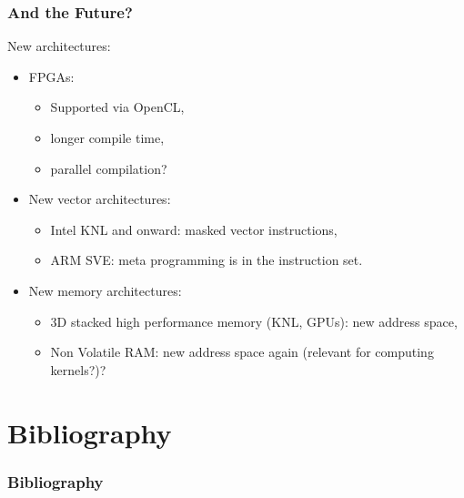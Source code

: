 \documentclass{beamer}
\begin{document}
\begin{frame}
  \frametitle{And the Future?}
  New architectures:
  \begin{itemize}
    \item FPGAs:
    \begin{itemize}
      \item Supported via OpenCL,
      \item longer compile time,
      \item parallel compilation?
    \end{itemize}
    \item New vector architectures:
    \begin{itemize}
      \item Intel KNL and onward: masked vector instructions,
      \item ARM SVE: meta programming is in the instruction set.
    \end{itemize}
    \item New memory architectures:
    \begin{itemize}
      \item 3D stacked high performance memory (KNL, GPUs): new address space,
      \item Non Volatile RAM: new address space again (relevant for computing kernels?)?
    \end{itemize}
  \end{itemize}
\end{frame}
\section{Bibliography}

\begin{frame}[shrink=50]
  \frametitle{Bibliography}
  
\end{frame}
\end{document}
